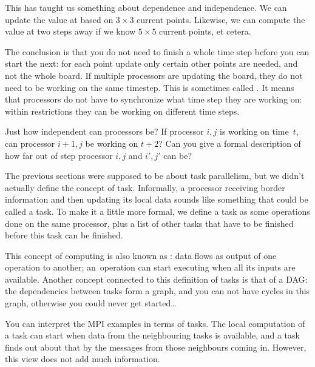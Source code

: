 This has taught us something about dependence and
independence. We can update
the value at  based on
$3\times3$ current points. 
Likewise, we can compute the value at  two steps away
if we know $5\times5$ current points, et cetera.

The conclusion is that you do not need to finish a whole time step before you 
can start the next: for each point update only certain other points
are needed, and not the whole board. If multiple processors are updating the board,
they do not need to be working on the same timestep.
This
is sometimes called .
It means that processors do not have to synchronize what time step they are working on:
within restrictions they can be working on different time steps.

\begin{exercise}
  Just how independent can processors be? If processor $i,j$ is
  working on time~$t$, can processor $i+1,j$ be working on $t+2$? Can
  you give a formal description of how far out of step processor $i,j$
  and $i',j'$ can be?
\end{exercise}

The previous sections were supposed to be about task parallelism, but
we didn't actually define the concept of task. Informally, a processor
receiving border information and then updating its local data sounds
like something that could be called a task.  To make it a little
more formal, we define a task as some operations done on the same
processor, plus a list of other tasks that have to be finished before
this task can be finished.

This concept of computing is also known as : data
flows as output of one operation to another; an~operation can start
executing when all its inputs are available. Another concept connected
to this definition of tasks is that of a \acf{DAG}: the dependencies
between tasks form a graph, and you can not have cycles in this graph,
otherwise you could never get started\ldots

You can interpret the MPI examples in terms of tasks.
The local computation of a task can start when data from the
neighbouring tasks is available, and a task finds out about that
by the messages from those neighbours coming in. However, 
this view does not add much information.

